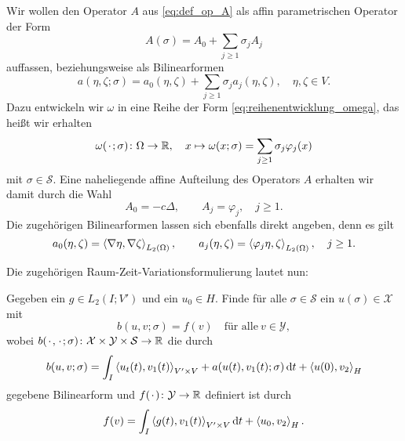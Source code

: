 Wir wollen den Operator $A$ aus \eqref{eq:def_op_A} als affin parametrischen Operator der Form
\begin{equation}
    \label{eq:aff_zerlegung_A}
    A(\sigma) = A_{0} + \sum_{j \geq 1} \sigma_{j} A_{j}
\end{equation}
auffassen, beziehungsweise als Bilinearformen
\begin{equation}
     \label{eq:aff_zerelgung_A_bf}
     a(\eta, \zeta; \sigma) = a_{0}(\eta, \zeta) + \sum_{j \geq 1} \sigma_{j} a_{j}(\eta, \zeta), \quad \eta, \zeta \in V.
 \end{equation}
Dazu entwickeln wir $\omega$ in eine Reihe der Form \eqref{eq:reihenentwicklung_omega}, das heißt wir erhalten
\begin{equation}
    \label{eq:omega_reihenentwicklung}
    \omega({\mkern2mu\cdot\mkern2mu}; \sigma) \colon \Omega \to \mathbb{R}, \quad x \mapsto \omega(x; \sigma) = \sum_{j \geq 1} \sigma_{j} \varphi_{j}(x)
\end{equation}
mit $\sigma \in \mathcal S$.
Eine naheliegende affine Aufteilung des Operators $A$ erhalten wir damit durch die Wahl
\begin{equation}
    \label{eq:affine_zerlegung_A_def}
    A_{0} = - c \Delta, \qquad
    A_{j} = \varphi_{j}, \quad j \geq 1.
\end{equation}
Die zugehörigen Bilinearformen lassen sich ebenfalls direkt angeben, denn es gilt
\begin{equation}
    a_{0}(\eta, \zeta) = \left\langle\nabla \eta,\nabla \zeta\right\rangle_{L_{2}(\Omega)}, \qquad a_{j}(\eta, \zeta) = \left\langle\varphi_{j} \eta,\zeta\right\rangle_{L_{2}(\Omega)}, \quad j \geq 1.
\end{equation}

Die zugehörigen Raum-Zeit-Variationsformulierung lautet nun:
\begin{Problem}
    Gegeben ein $g \in L_{2}(I; V')$ und ein $u_{0} \in H$. Finde für alle $\sigma \in \mathcal S$ ein $u(\sigma) \in \mathcal X$ mit
    \begin{equation}
        \label{eq:varprob_2}
        b(u, v; \sigma) = f(v) \quad \text{für alle}~v \in \mathcal Y,
    \end{equation}
    wobei $b({\mkern2mu\cdot\mkern2mu}, {\mkern2mu\cdot\mkern2mu}; \sigma) \colon \mathcal X \times \mathcal Y \times \mathcal S \to \mathbb{R}$ die durch
    \begin{equation}
        \label{eq:buv_2}
        b(u, v; \sigma)
            = \int_{I} \left\langle u_{t}(t),v_{1}(t)\right\rangle_{V' \times V} + a(u(t), v_{1}(t); \sigma) \mathop{}\!\mathrm{d} t + \left\langle u(0),v_{2}\right\rangle_{H}
    \end{equation}
    gegebene Bilinearform und $f({\mkern2mu\cdot\mkern2mu}) \colon \mathcal Y \to \mathbb{R}$ definiert ist durch
    \begin{equation}
        \label{eq:var_all_f_wiederholung_2}
        f(v) = \int_{I} \left\langle g(t),v_{1}(t)\right\rangle_{V' \times V} \mathop{}\!\mathrm{d} t + \left\langle u_{0},v_{2}\right\rangle_{H}.
    \end{equation}
\end{Problem}

